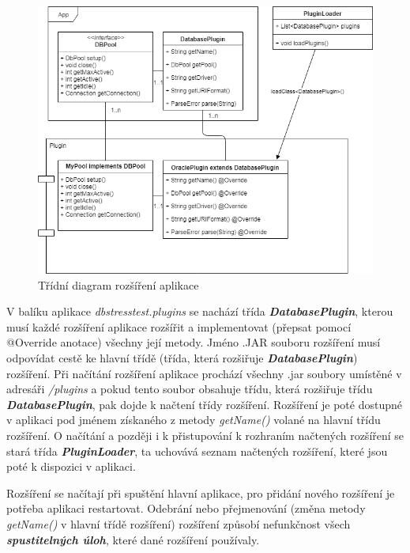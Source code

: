 \documentclass[czech,bachelor,public,dept460,male,cpdeclaration,twoside]{diploma}
\begin{document}
\newpage
\begin{figure}[!htbp]\centering\includegraphics[width=1.0\textwidth]{Figures/plugins.png}\caption{Třídní diagram rozšíření aplikace}
\label{pluginsdiag}
\end{figure}

V balíku aplikace \textit{dbstresstest.plugins} se nachází třída \textbf{\emph{DatabasePlugin}}, kterou musí každé rozšíření aplikace rozšířit a implementovat (přepsat pomocí @Override anotace) všechny její metody. Jméno .JAR souboru rozšíření musí odpovídat cestě ke hlavní třídě (třída, která rozšiřuje \textbf{\emph{DatabasePlugin}}) rozšíření. Při načítání rozšíření aplikace prochází všechny .jar soubory umístěné v adresáři \textit{/plugins} a pokud tento soubor obsahuje třídu, která rozšiřuje třídu \textbf{\emph{DatabasePlugin}}, pak dojde k načtení třídy rozšíření. Rozšíření je poté dostupné v aplikaci pod jménem získaného z metody \textit{getName()} volané na hlavní třídu rozšíření. O načítání a později i k přistupování k rozhraním načtených rozšíření se stará třída \textbf{\emph{PluginLoader}}, ta uchovává seznam načtených rozšíření, které jsou poté k dispozici v aplikaci.

Rozšíření se načítají při spuštění hlavní aplikace, pro přidání nového rozšíření je potřeba aplikaci restartovat. Odebrání nebo přejmenování (změna metody \textit{getName()} v hlavní třídě rozšíření) rozšíření způsobí nefunkčnost všech \textbf{\emph{spustitelných úloh}}, které dané rozšíření používaly.
\end{document}
